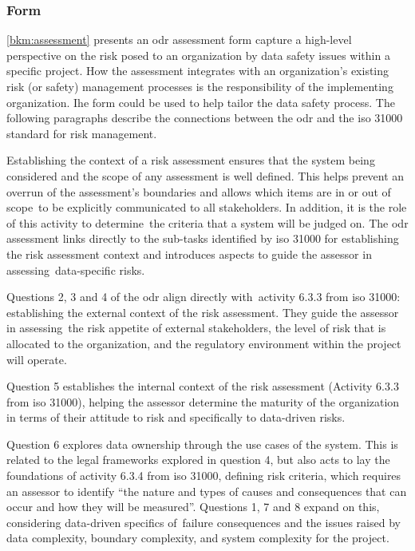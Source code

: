 \subsubsection{ Form}
\cbstart\autoref{bkm:assessment} presents an \gls{odr} assessment form capture a high-level perspective on the risk posed to an organization by data safety issues within a specific project. How the assessment integrates with an organization's existing risk (or safety) management processes is the responsibility of the implementing organization. Ihe form could be used to help tailor the data safety process. The following paragraphs describe the connections between the \gls{odr} and the
\acrshort{iso} 31000 \cite{citation:iso310002018risk}
standard for risk management\cbend.

Establishing the context of a risk assessment ensures that the system being considered and the scope of any assessment is well defined. This helps prevent an overrun of the assessment's boundaries and allows \cbstart which items are in or out of scope\cbend\ to be explicitly communicated to all \glspl{stakeholder}. In addition, it is the role of this activity to \cbstart determine\cbend\ the criteria that a system will be judged on. The \gls{odr} assessment links directly to the sub-tasks identified by \acrshort{iso} 31000 for establishing the risk assessment context and introduces aspects to guide the assessor \cbstart in assessing\cbend\  data-specific risks.

Questions 2, 3 and 4 of the \gls{odr} align directly with\cbstart\ activity 6.3.3 from \acrshort{iso} 31000: establishing the external context of the risk assessment.
They guide the assessor in assessing\cbend\ the risk appetite of external \glspl{stakeholder}, the level of risk that is allocated to the organization, and the regulatory environment within the project will operate.

Question 5 \cbstart establishes the internal context of the risk assessment (Activity 6.3.3 from \acrshort{iso} 31000),
helping the assessor determine the maturity of the organization in terms of their attitude to risk and specifically to data-driven risks\cbend.

Question 6 explores data ownership through the use cases of the system. This is related to the legal frameworks explored in question 4, but also acts to lay the foundations of activity 6.3.4 \cbstart from \acrshort{iso} 31000\cbend,
defining risk criteria, which requires an assessor to identify ``the nature and types of causes and consequences that can occur and how they will be measured''. \cbstart Questions 1, 7 and 8 expand on this, considering data-driven specifics of\cbend\ failure consequences and the issues raised by data complexity, boundary complexity, and system complexity for the project.

